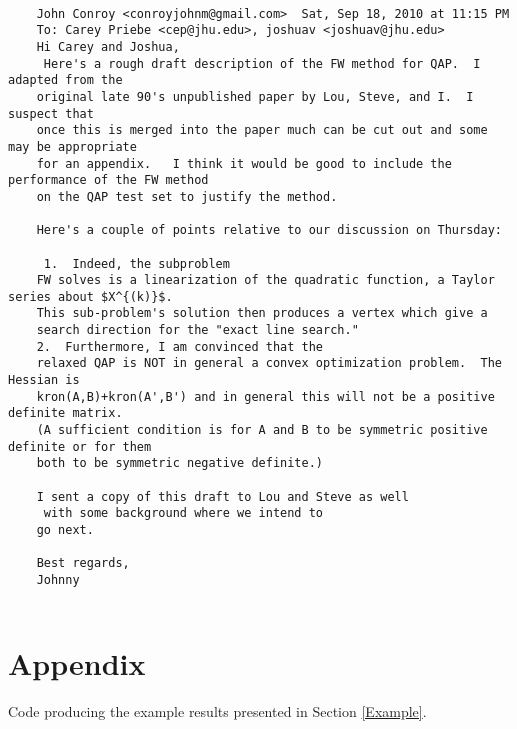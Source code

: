 \begin{verbatim}

	John Conroy <conroyjohnm@gmail.com>	 Sat, Sep 18, 2010 at 11:15 PM
	To: Carey Priebe <cep@jhu.edu>, joshuav <joshuav@jhu.edu>
	Hi Carey and Joshua,
	 Here's a rough draft description of the FW method for QAP.  I adapted from the
	original late 90's unpublished paper by Lou, Steve, and I.  I suspect that 
	once this is merged into the paper much can be cut out and some may be appropriate
	for an appendix.   I think it would be good to include the performance of the FW method
	on the QAP test set to justify the method. 

	Here's a couple of points relative to our discussion on Thursday:

	 1.  Indeed, the subproblem
	FW solves is a linearization of the quadratic function, a Taylor series about $X^{(k)}$.  
	This sub-problem's solution then produces a vertex which give a 
	search direction for the "exact line search."   
	2.  Furthermore, I am convinced that the
	relaxed QAP is NOT in general a convex optimization problem.  The Hessian is 
	kron(A,B)+kron(A',B') and in general this will not be a positive definite matrix.
	(A sufficient condition is for A and B to be symmetric positive definite or for them
	both to be symmetric negative definite.)

	I sent a copy of this draft to Lou and Steve as well
	 with some background where we intend to
	go next.

	Best regards,
	Johnny


\end{verbatim}


\section*{Appendix}

Code producing the example results presented in Section \ref{Example}.

